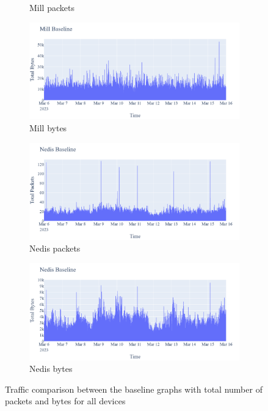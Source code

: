 \begin{figure}[H]
\begin{subfigure}[b]{0.4\textwidth}
        \caption{Mill packets}
    \end{subfigure}
    \begin{subfigure}[b]{0.4\textwidth}
        \centering
        \includegraphics[width=1\hsize]{figures/Mill_Baseline_TotalBytes.png}
        \caption{Mill bytes}
    \end{subfigure}
    \begin{subfigure}[b]{0.4\textwidth}
        \centering
        \includegraphics[width=1\hsize]{figures/Nedis_Baseline_TotalPackets.png}
        \caption{Nedis packets}
    \end{subfigure}
    \begin{subfigure}[b]{0.4\textwidth}
        \centering
        \includegraphics[width=1\hsize]{figures/Nedis_Baseline_TotalBytes.png}
        \caption{Nedis bytes}
    \end{subfigure}
    \caption{Traffic comparison between the baseline graphs with total number of packets and bytes for all devices}
    \label{fig:ComparingBaselines}
\end{figure}

